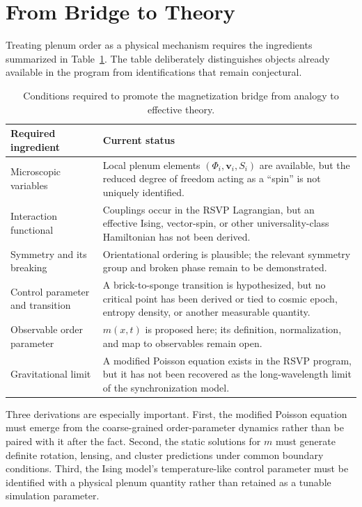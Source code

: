 \documentclass[11pt]{article}
\begin{document}
\section{From Bridge to Theory}
\label{sec:criteria}

Treating plenum order as a physical mechanism requires the ingredients summarized in Table~\ref{tab:bridge}. The table deliberately distinguishes objects already available in the program from identifications that remain conjectural.

\begin{table}[ht]
\centering
\small
\begin{tabular}{>{\raggedright\arraybackslash}p{} >{\raggedright\arraybackslash}p{}}
\toprule
\textbf{Required ingredient} & \textbf{Current status} \\
\midrule
Microscopic variables & Local plenum elements $(\Phi_i,\mathbf{v}_i,S_i)$ are available, but the reduced degree of freedom acting as a ``spin'' is not uniquely identified. \\
Interaction functional & Couplings occur in the RSVP Lagrangian, but an effective Ising, vector-spin, or other universality-class Hamiltonian has not been derived. \\
Symmetry and its breaking & Orientational ordering is plausible; the relevant symmetry group and broken phase remain to be demonstrated. \\
Control parameter and transition & A brick-to-sponge transition is hypothesized, but no critical point has been derived or tied to cosmic epoch, entropy density, or another measurable quantity. \\
Observable order parameter & $m(x,t)$ is proposed here; its definition, normalization, and map to observables remain open. \\
Gravitational limit & A modified Poisson equation exists in the RSVP program, but it has not been recovered as the long-wavelength limit of the synchronization model. \\
\bottomrule
\end{tabular}
\caption{Conditions required to promote the magnetization bridge from analogy to effective theory.}
\label{tab:bridge}
\end{table}

Three derivations are especially important. First, the modified Poisson equation must emerge from the coarse-grained order-parameter dynamics rather than be paired with it after the fact. Second, the static solutions for $m$ must generate definite rotation, lensing, and cluster predictions under common boundary conditions. Third, the Ising model's temperature-like control parameter must be identified with a physical plenum quantity rather than retained as a tunable simulation parameter.
\end{document}
